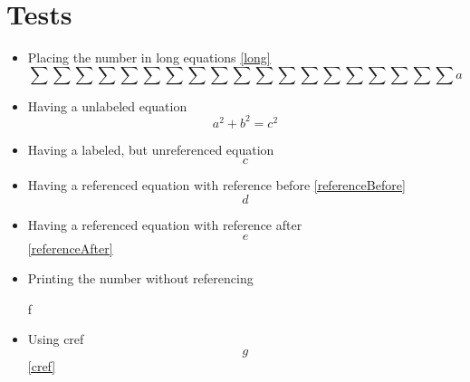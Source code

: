 \documentclass{article}
\begin{document}
	\section*{Tests}
	\begin{itemize}
		\item Placing the number in long equations \ref{long}
			\begin{equation}\label{long}
				\sum\sum\sum\sum\sum\sum\sum\sum\sum\sum\sum\sum\sum\sum\sum\sum\sum\sum\sum a
			\end{equation}
		\item Having a unlabeled equation
			\begin{equation}
				a^2 + b^2 = c^2
			\end{equation}
		\item Having a labeled, but unreferenced equation
			\begin{equation}\label{unreferenced}
				c
			\end{equation}
		\item Having a referenced equation with reference before \ref{referenceBefore}
			\begin{equation}\label{referenceBefore}
				d
			\end{equation}
		\item Having a referenced equation with reference after
			\begin{equation}\label{referenceAfter}
				e
			\end{equation}
			\ref{referenceAfter}
		\item Printing the number without referencing
			\begin{equation+}
				f
			\end{equation+}
		\item Using cref
			\begin{equation}\label{cref}
				g
			\end{equation}
			\cref{cref}
	\end{itemize}
\end{document}
